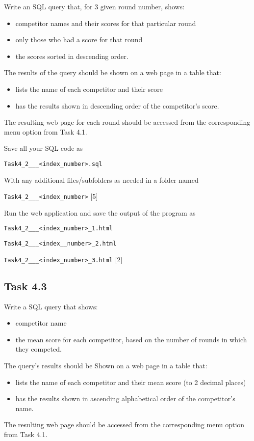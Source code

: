 Write an SQL query that, for 3 given round number, shows:
\begin{itemize}
\item competitor names and their scores for that particular round
\item only those who had a score for that round
\item the scores sorted in descending order.
\end{itemize}
The results of the query should be shown on a web page in a table
that:
\begin{itemize}
\item lists the name of each competitor and their score 
\item has the results shown in descending order of the competitor's score.
\end{itemize}
The resulting web page for each round should be accessed from the
corresponding menu option from Task 4.1.

Save all your SQL code as

\texttt{Task4\_2\_<your name>\_<centre number>\_<index\_number>.sql}

With any additional files/subfolders as needed in a folder named

\texttt{Task4\_2\_<your name>\_<centre number>\_<index\_number>} \hfill{}{[}5{]}

Run the web application and save the output of the program as

\texttt{Task4\_2\_<your name>\_<centre number>\_<index\_number>\_1.html}

\texttt{Task4\_2\_<your name>\_<centre number>\_<index\_\_number>\_2.html}

\texttt{Task4\_2\_<your name>\_<centre number>\_<index\_number>\_3.html}
\hfill{}{[}2{]}

\subsection*{Task 4.3 }

Write a SQL query that shows:
\begin{itemize}
\item competitor name
\item the mean score for each competitor, based on the number of rounds
in which they competed. 
\end{itemize}
The query's results should be Shown on a web page in a table that:
\begin{itemize}
\item lists the name of each competitor and their mean score (to 2 decimal
places)
\item has the results shown in ascending alphabetical order of the competitor's
name.
\end{itemize}
The resulting web page should be accessed from the corresponding menu
option from Task 4.1. 

